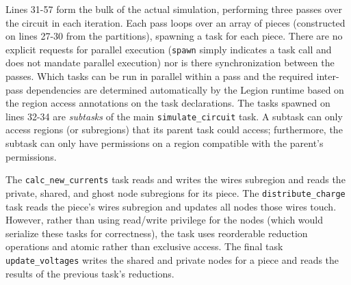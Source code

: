 Lines 31-57 form the bulk of the actual simulation, performing three
passes over the circuit in each iteration.  Each pass loops over an
array of pieces (constructed on lines 27-30 from the partitions),
spawning a task for each piece.  There are no explicit requests for
parallel execution ({\tt spawn} simply indicates a task call and does
not mandate parallel execution) nor is there synchronization 
between the passes.  Which tasks can be run in
parallel within a pass and the required inter-pass dependencies are
determined automatically by the Legion runtime based on the region
access annotations on the task declarations.  The tasks spawned on
lines 32-34 are {\em subtasks} of the main {\tt simulate\_circuit}
task. A subtask can only access regions (or subregions) that its parent task
could access; furthermore, the subtask can only have permissions on a
region compatible with the parent's permissions.  

The  {\tt calc\_new\_currents} task reads and writes the wires subregion 
and reads the private, shared, and ghost node subregions for its piece.
The {\tt distribute\_charge} task reads the piece's 
wires subregion and updates all nodes those wires touch.  However,
rather than using read/write privilege for the nodes (which would
serialize these tasks for correctness), the task
uses reorderable reduction operations and 
atomic rather than exclusive access. The final task 
{\tt update\_voltages} writes the shared and private nodes for a piece
and reads the results of the previous task's reductions.

  



